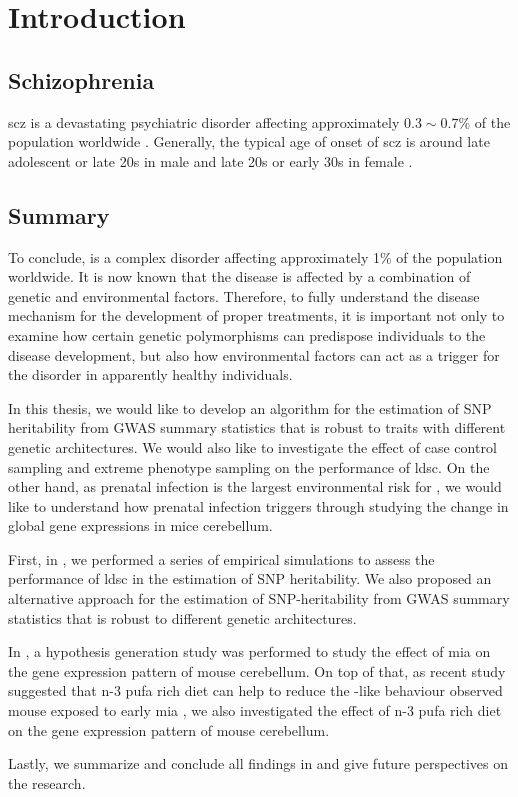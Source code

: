 	\chapter{Introduction}
	\section{Schizophrenia}
	\Gls{scz} is a devastating psychiatric disorder affecting approximately $0.3\sim0.7\%$ of the population  worldwide \citep{AmericanPsychiatricAssociation2013}.
	Generally, the typical age of onset of \gls{scz} is around late adolescent or late 20s in male and late 20s or early 30s in female \citep{Schultz2007}.
	
	
	
	
	
	\section{Summary}
	To conclude,  is a complex disorder affecting approximately 1\% of the population worldwide. 
	It is now known that the disease is affected by a combination of genetic and environmental factors. 
	Therefore, to fully understand the disease mechanism for the development of proper treatments, it is important not only to examine how certain genetic polymorphisms can predispose individuals to the disease development, but also how environmental factors can act as a trigger for the disorder in apparently healthy individuals.  
	
	In this thesis, we would like to develop an algorithm for the estimation of \gls{SNP} heritability from \gls{GWAS} summary statistics that is robust to traits with different genetic architectures. 
	We would also like to investigate the effect of case control sampling and extreme phenotype sampling on the performance of \gls{ldsc}.
	On the other hand, as prenatal infection is the largest environmental risk for , we would like to understand how prenatal infection triggers  through studying the change in global gene expressions in mice cerebellum.
	
	First, in , we performed a series of empirical simulations to assess the performance of \gls{ldsc} in the estimation of \gls{SNP} heritability. 
	We also proposed an alternative approach for the estimation of \gls{SNP}-heritability from \gls{GWAS} summary statistics that is robust to different genetic architectures.
	
	In , a hypothesis generation study was performed to study the effect of \gls{mia} on the gene expression pattern of mouse cerebellum. 
	On top of that, as recent study suggested that n-3 \gls{pufa} rich diet can help to reduce the -like behaviour observed mouse exposed to early \gls{mia} \citep{Li2015}, we also investigated the effect of n-3 \gls{pufa} rich diet on the gene expression pattern of mouse cerebellum.
	
	Lastly, we summarize and conclude all findings in  and give future perspectives on the  research.
	